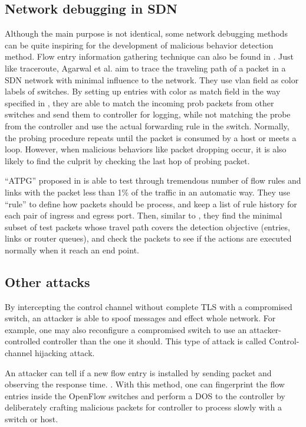 \subsection{Network debugging in SDN}
Although the main purpose is not identical, some network debugging methods can be quite inspiring for the development of malicious behavior detection method. Flow entry information gathering technique can also be found in \cite{ARDC14}. Just like traceroute, Agarwal et al. aim to trace the traveling path of a packet in a SDN network with minimal influence to the network. They use vlan field as color labels of switches. By setting up entries with color as match field in the way specified in \cite{ARDC14}, they are able to match the incoming prob packets from other switches and send them to controller for logging, while not matching the probe from the controller and use the actual forwarding rule in the switch. Normally, the probing procedure repeats until the packet is consumed by a host or meets a loop. However, when malicious behaviors like packet dropping occur, it is also likely to find the culprit by checking the last hop of probing packet.

``ATPG'' proposed in \cite{ZKVM12} is able to test through tremendous number of flow rules and links with the packet less than 1\% of the traffic in an automatic way. They use ``rule'' to define how packets should be process, and keep a list of rule history for each pair of ingress and egress port. Then, similar to \cite{PJL16}, they find the minimal subset of test packets whose travel path covers the detection objective (entries, links or router queues), and check the packets to see if the actions are executed normally when it reach an end point. 

\subsection{Other attacks}
By intercepting the control channel without complete TLS with a compromised switch, an attacker is able to spoof messages and effect whole network. For example, one may also reconfigure a compromised switch to use an attacker-controlled controller than the one it should. This type of attack is called Control-channel hijacking attack.

An attacker can tell if a new flow entry is installed by sending packet and observing the response time. \cite{BCKK15}. With this method, one can fingerprint the flow entries inside the OpenFlow switches and perform a DOS to the controller by deliberately crafting malicious packets for controller to process slowly with a switch or host\cite{AAS14}.
